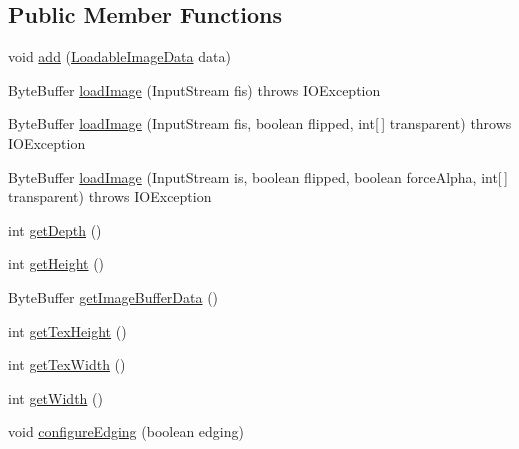 \subsection*{Public Member Functions}
\begin{DoxyCompactItemize}
\item 
void \mbox{\hyperlink{classorg_1_1newdawn_1_1slick_1_1opengl_1_1_composite_image_data_ac36327aa091c87d4ef3426c1b8e476b4}{add}} (\mbox{\hyperlink{interfaceorg_1_1newdawn_1_1slick_1_1opengl_1_1_loadable_image_data}{Loadable\+Image\+Data}} data)
\item 
Byte\+Buffer \mbox{\hyperlink{classorg_1_1newdawn_1_1slick_1_1opengl_1_1_composite_image_data_afac01aa86b627c3e172aeb7e66ec2b2f}{load\+Image}} (Input\+Stream fis)  throws I\+O\+Exception 
\item 
Byte\+Buffer \mbox{\hyperlink{classorg_1_1newdawn_1_1slick_1_1opengl_1_1_composite_image_data_a6fa4aa2e8b4b4768415f2a40a7acb8f1}{load\+Image}} (Input\+Stream fis, boolean flipped, int\mbox{[}$\,$\mbox{]} transparent)  throws I\+O\+Exception 
\item 
Byte\+Buffer \mbox{\hyperlink{classorg_1_1newdawn_1_1slick_1_1opengl_1_1_composite_image_data_abdc1f3d531423e34b3f8a04e4854e5c5}{load\+Image}} (Input\+Stream is, boolean flipped, boolean force\+Alpha, int\mbox{[}$\,$\mbox{]} transparent)  throws I\+O\+Exception 
\item 
int \mbox{\hyperlink{classorg_1_1newdawn_1_1slick_1_1opengl_1_1_composite_image_data_a4f8b573391ec1fea885ef56daac0a8f4}{get\+Depth}} ()
\item 
int \mbox{\hyperlink{classorg_1_1newdawn_1_1slick_1_1opengl_1_1_composite_image_data_a4dbc5f72fe7bfb16716c631c8b12c5fb}{get\+Height}} ()
\item 
Byte\+Buffer \mbox{\hyperlink{classorg_1_1newdawn_1_1slick_1_1opengl_1_1_composite_image_data_a3f1eae47b620e0eb4172fb58a87f5894}{get\+Image\+Buffer\+Data}} ()
\item 
int \mbox{\hyperlink{classorg_1_1newdawn_1_1slick_1_1opengl_1_1_composite_image_data_ac0733bc4b03bf553a9374b858343a0f0}{get\+Tex\+Height}} ()
\item 
int \mbox{\hyperlink{classorg_1_1newdawn_1_1slick_1_1opengl_1_1_composite_image_data_aa669973b504de478c91db03a0319b389}{get\+Tex\+Width}} ()
\item 
int \mbox{\hyperlink{classorg_1_1newdawn_1_1slick_1_1opengl_1_1_composite_image_data_afacb76ad47cbb2ce231c2f92ed87458c}{get\+Width}} ()
\item 
void \mbox{\hyperlink{classorg_1_1newdawn_1_1slick_1_1opengl_1_1_composite_image_data_a9f2859d594b5040ea7ab930f194412ac}{configure\+Edging}} (boolean edging)
\end{DoxyCompactItemize}
